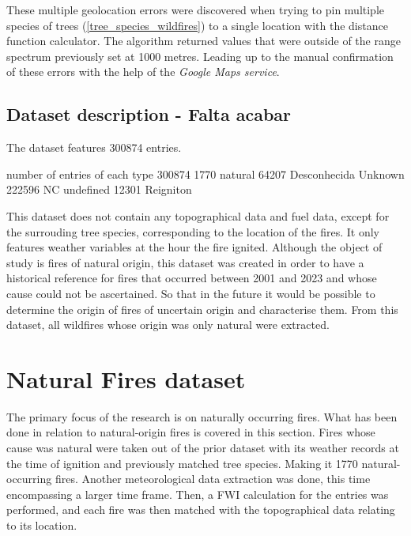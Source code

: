 These multiple geolocation errors were discovered when trying to pin multiple species of trees (\ref{tree_species_wildfires}) to a single location with the distance function calculator. The algorithm returned values that were outside of the range spectrum previously set at 1000 metres. Leading up to the manual confirmation of these errors with the help of the \textit{Google Maps service}.


\subsection{Dataset description - Falta acabar}
The dataset features 300874 entries. 

number of entries of each type 300874
1770 natural
64207 Desconhecida Unknown
222596 NC undefined
12301 Reigniton



This dataset does not contain any topographical data and fuel data, except for the surrouding tree species, corresponding to the location of the fires. It only features weather variables at the hour the fire ignited. Although the object of study is fires of natural origin, this dataset was created in order to have a historical reference for fires that occurred between 2001 and 2023 and whose cause could not be ascertained. So that in the future it would be possible to determine the origin of fires of uncertain origin and characterise them. From this dataset, all wildfires whose origin was only natural were extracted.





\section{Natural Fires dataset}
\label{Natural_Fires_dataset}
The primary focus of the research is on naturally occurring fires. What has been done in relation to natural-origin fires is covered in this section. Fires whose cause was natural were taken out of the prior dataset with its weather records at the time of ignition and previously matched tree species. Making it 1770 natural-occurring fires. Another meteorological data extraction was done, this time encompassing a larger time frame. Then, a FWI calculation for the entries was performed, and each fire was then matched with the topographical data relating to its location.

